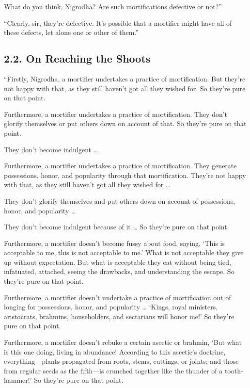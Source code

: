 \documentclass[12pt,openany]{book}%
\begin{document}
What do you think, Nigrodha? Are such mortifications defective or not?” 

“Clearly, sir, they’re defective. It’s possible that a mortifier might have all of these defects, let alone one or other of them.” 

\subsection*{2.2. On Reaching the Shoots }

“Firstly, Nigrodha, a mortifier undertakes a practice of mortification. But they’re not happy with that, as they still haven’t got all they wished for. So they’re pure on that point. 

Furthermore, a mortifier undertakes a practice of mortification. They don’t glorify themselves or put others down on account of that. So they’re pure on that point. 

They don’t become indulgent … 

Furthermore, a mortifier undertakes a practice of mortification. They generate possessions, honor, and popularity through that mortification. They’re not happy with that, as they still haven’t got all they wished for … 

They don’t glorify themselves and put others down on account of possessions, honor, and popularity … 

They don’t become indulgent because of it … So they’re pure on that point. 

Furthermore, a mortifier doesn’t become fussy about food, saying, ‘This is acceptable to me, this is not acceptable to me.’ What is not acceptable they give up without expectation. But what is acceptable they eat without being tied, infatuated, attached, seeing the drawbacks, and understanding the escape. So they’re pure on that point. 

Furthermore, a mortifier doesn’t undertake a practice of mortification out of longing for possessions, honor, and popularity … ‘Kings, royal ministers, aristocrats, brahmins, householders, and sectarians will honor me!’ So they’re pure on that point. 

Furthermore, a mortifier doesn’t rebuke a certain ascetic or brahmin, ‘But what is this one doing, living in abundance! According to this ascetic’s doctrine, everything—plants propagated from roots, stems, cuttings, or joints; and those from regular seeds as the fifth—is crunched together like the thunder of a tooth-hammer!’ So they’re pure on that point. 
\end{document}
